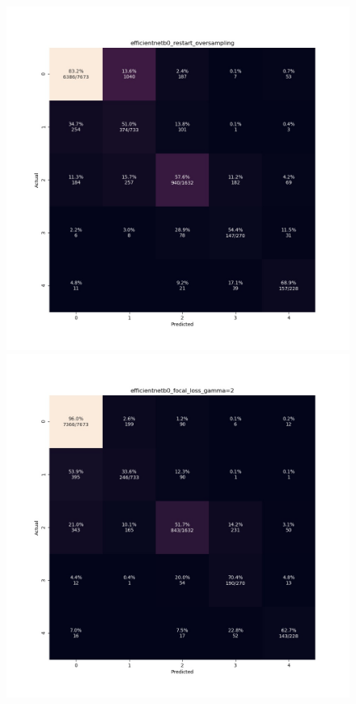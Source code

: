 \documentclass[../main.tex]{subfiles}
\begin{document}
\begin{figure}[htbp]
\begin{minipage}{5cm}
\subcaption{}
\end{minipage}
\begin{minipage}{5cm}
\centering
\includegraphics[width=1\linewidth]{efficientnetb0_restart_oversampling.jpeg}
\subcaption{}
\end{minipage}
\begin{minipage}{5cm}
\centering
\includegraphics[width=1\linewidth]{efficientnetb0_focal_loss.jpeg}

\end{minipage}
\end{figure}
\end{document}
